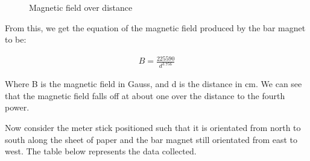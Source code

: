 \documentclass[12pt]{article}
\begin{document}
\begin{figure}[H]
    \centering

    \caption[10pt]{Magnetic field over distance}

\end{figure}

From this, we get the equation of the magnetic field produced by the bar magnet to be:

\begin{equation*}
    \begin{split}
        B = \frac{225590}{d^{3.756}}
    \end{split}
\end{equation*}

Where B is the magnetic field in Gauss, and d is the distance in cm. We can see that the magnetic field falls off at about one over the distance to the fourth power.

\bigskip

Now consider the meter stick positioned such that it is orientated from north to south along the sheet of paper and the bar magnet still orientated from east to west. The table below represents the data collected.

\setlength{\tabcolsep}{2pt}
\renewcommand{\arraystretch}{1.25}
\end{document}
